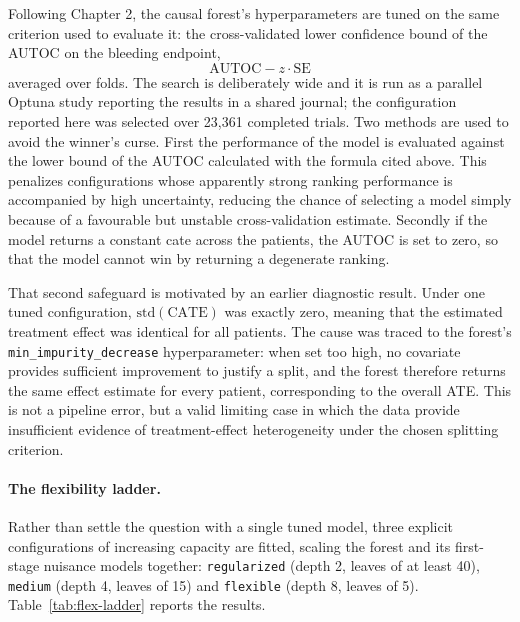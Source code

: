 Following Chapter 2, the causal forest's hyperparameters are tuned on the same
criterion used to evaluate it: the cross-validated lower confidence bound of
the AUTOC on the bleeding endpoint,
\[
\mathrm{AUTOC} - z \cdot \mathrm{SE}
\]
averaged over folds. The search is deliberately wide and it is run as a parallel
Optuna study reporting the results in a shared journal;
the configuration reported here was selected over 23,361 completed trials.
Two methods are used to avoid the winner's curse. First the performance of the model
is evaluated against the lower bound of the AUTOC calculated with the formula cited above.
This penalizes configurations whose apparently strong ranking performance is accompanied
by high uncertainty, reducing the chance of selecting a model simply because of a
favourable but unstable cross-validation estimate. Secondly if the model returns a
constant cate across the patients, the AUTOC is set to zero, so that
the model cannot win by returning a degenerate ranking.

That second safeguard is motivated by an earlier diagnostic result. Under one
tuned configuration, $\mathrm{std}(\mathrm{CATE})$ was exactly zero, meaning
that the estimated treatment effect was identical for all patients. The cause
was traced to the forest's \texttt{min\_impurity\_decrease} hyperparameter:
when set too high, no covariate provides sufficient improvement to justify a
split, and the forest therefore returns the same effect estimate for every
patient, corresponding to the overall ATE. This is not a pipeline error, but
a valid limiting case in which the data provide insufficient evidence of
treatment-effect heterogeneity under the chosen splitting criterion.

\paragraph{The flexibility ladder.}
Rather than settle the question with a single tuned model, three explicit
configurations of increasing capacity are fitted, scaling the forest and its
first-stage nuisance models together: \texttt{regularized} (depth 2, leaves of
at least 40), \texttt{medium} (depth 4, leaves of 15) and \texttt{flexible}
(depth 8, leaves of 5). Table~\ref{tab:flex-ladder} reports the results.

